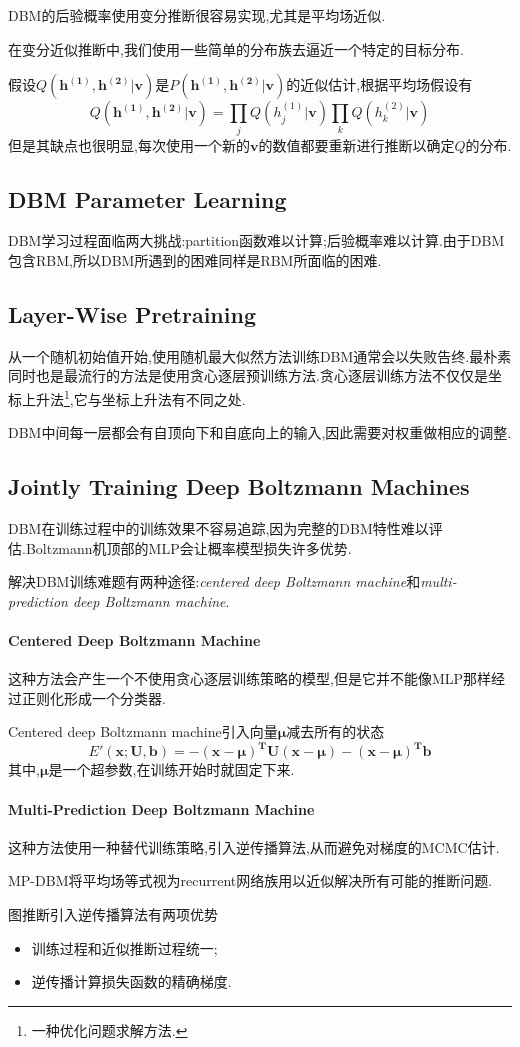 DBM的后验概率使用变分推断很容易实现,尤其是平均场近似.

在变分近似推断中,我们使用一些简单的分布族去逼近一个特定的目标分布.

假设$Q(\bm{h^{(1)},h^{(2)}|v})$是$P(\bm{h^{(1)},h^{(2)}|v})$的近似估计,根据平均场假设有
\begin{equation}
Q(\bm{h^{(1)},h^{(2)}|v})=\prod_jQ(h_j^{(1)}|\bm v)\prod_kQ(h_k^{(2)}|\bm v)
\end{equation}
但是其缺点也很明显,每次使用一个新的$\bm v$的数值都要重新进行推断以确定$Q$的分布.

\subsection{DBM Parameter Learning}

DBM学习过程面临两大挑战:partition函数难以计算;后验概率难以计算.由于DBM包含RBM,所以DBM所遇到的困难同样是RBM所面临的困难.

\subsection{Layer-Wise Pretraining}

从一个随机初始值开始,使用随机最大似然方法训练DBM通常会以失败告终.最朴素同时也是最流行的方法是使用贪心逐层预训练方法.贪心逐层训练方法不仅仅是坐标上升法\footnote{一种优化问题求解方法.},它与坐标上升法有不同之处.

DBM中间每一层都会有自顶向下和自底向上的输入,因此需要对权重做相应的调整.

\subsection{Jointly Training Deep Boltzmann Machines}

DBM在训练过程中的训练效果不容易追踪,因为完整的DBM特性难以评估.Boltzmann机顶部的MLP会让概率模型损失许多优势.

解决DBM训练难题有两种途径:\textit{centered deep Boltzmann machine}和\textit{multi-prediction deep Boltzmann machine}.

\paragraph{Centered Deep Boltzmann Machine}这种方法会产生一个不使用贪心逐层训练策略的模型,但是它并不能像MLP那样经过正则化形成一个分类器.

Centered deep Boltzmann machine引入向量$\bm\mu$减去所有的状态
\begin{equation}
E'(\bm{x;U,b})=\bm{-(x-\mu)^TU(x-\mu)-(x-\mu)^Tb}
\end{equation}
其中,$\bm\mu$是一个超参数,在训练开始时就固定下来.

\paragraph{Multi-Prediction Deep Boltzmann Machine}这种方法使用一种替代训练策略,引入逆传播算法,从而避免对梯度的MCMC估计.

MP-DBM将平均场等式视为recurrent网络族用以近似解决所有可能的推断问题.

图推断引入逆传播算法有两项优势
\begin{itemize}
    \item 训练过程和近似推断过程统一;
    \item 逆传播计算损失函数的精确梯度.
\end{itemize}